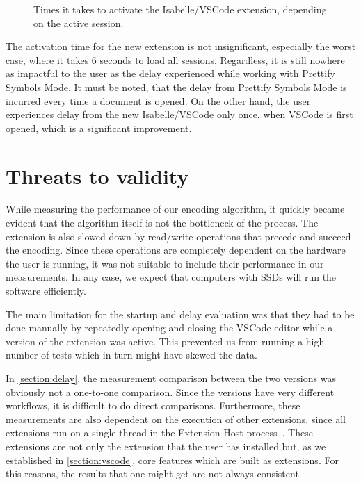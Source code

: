 \begin{figure}[!ht]
\centering
{}
\caption{Times it takes to activate the Isabelle/VSCode extension, depending on the active session.}
\label{fig:activate-time}
\end{figure}

The activation time for the new extension is not insignificant, especially the worst case, where it takes 6 seconds to load all sessions. Regardless, it is still nowhere as impactful to the user as the delay experienced while working with Prettify Symbols Mode. It must be noted, that the delay from Prettify Symbols Mode is incurred every time a document is opened. On the other hand, the user experiences delay from the new Isabelle/VSCode only once, when VSCode is first opened, which is a significant improvement. 

\section{Threats to validity}
While measuring the performance of our encoding algorithm, it quickly became evident that the algorithm itself is not the bottleneck of the process. The extension is also slowed down by read/write operations that precede and succeed the encoding. Since these operations are completely dependent on the hardware the user is running, it was not suitable to include their performance in our measurements. In any case, we expect that computers with SSDs will run the software efficiently.

The main limitation for the startup and delay evaluation was that they had to be done manually by repeatedly opening and closing the VSCode editor while a version of the extension was active. This prevented us from running a high number of tests which in turn might have skewed the data. 

In \autoref{section:delay}, the measurement comparison between the two versions was obviously not a one-to-one comparison. Since the versions have very different workflows, it is difficult to do direct comparisons. Furthermore, these measurements are also dependent on the execution of other extensions, since all extensions run on a single thread in the Extension Host process~\parencite{vscode-extension-host}. These extensions are not only the extension that the user has installed but, as we established in \autoref{section:vscode}, core features which are built as extensions. For this reasons, the results that one might get are not always consistent.